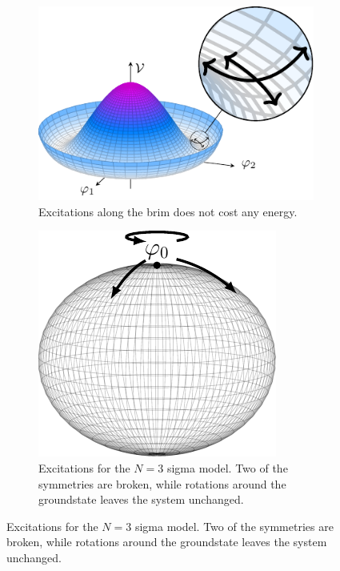 \begin{figure}[h]
    \centering
    \begin{subfigure}{0.54\textwidth}
        \centering
        \includegraphics[]{figurer/mexican_hat_zoom.pdf}
        \caption{Excitations along the brim does not cost any energy.}
        \label{fig:Mexican hat zoom}
    \end{subfigure}
    \begin{subfigure}{0.45\textwidth}
        \centering
        \includegraphics[]{figurer/sigma_ground_state.pdf}
        \caption{Excitations for the $N=3$ sigma model. Two of the symmetries are broken, while rotations around the groundstate leaves the system unchanged.}
        \label{fig:ground state manifold}
    \end{subfigure}
\end{figure}


